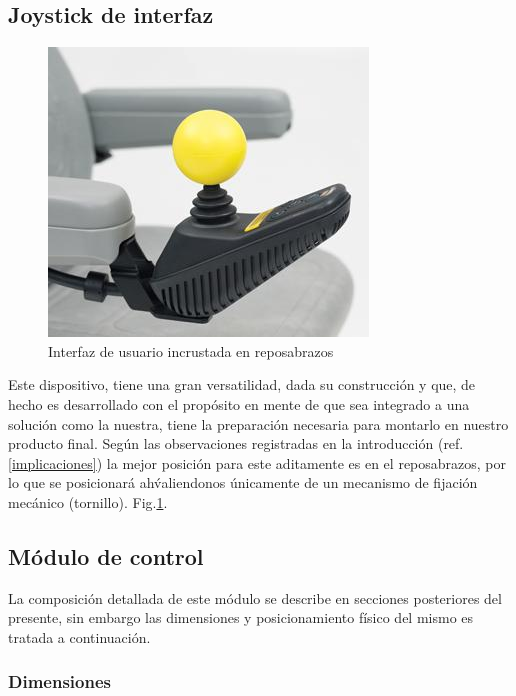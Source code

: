 \subsection{Joystick de interfaz}
\begin{figure}[th]
    \centering
    \includegraphics[width=.4\textwidth]{Figures/joystick.jpg}
    \decoRule
    \caption{Interfaz de usuario incrustada en reposabrazos}
    \label{fig:joy}
\end{figure}

Este dispositivo, tiene una gran versatilidad, dada su construcci\'on y que, de
hecho es desarrollado con el prop\'osito en mente de que sea integrado a una
soluci\'on como la nuestra, tiene la preparaci\'on necesaria para montarlo en
nuestro producto final. Seg\'un las observaciones registradas en la
introducci\'on (ref.\ref{implicaciones}) la mejor posici\'on para este
aditamente es en el reposabrazos, por lo que  se posicionar\'a ah\' valiendonos
\'unicamente de un mecanismo de fijaci\'on mec\'anico (tornillo).
Fig.\ref{fig:joy}.

\subsection{M\'odulo de control}

La composici\'on detallada de este m\'odulo se describe en secciones posteriores
del presente, sin embargo las dimensiones y posicionamiento f\'isico del mismo
es tratada a continuaci\'on.

\subsubsection{Dimensiones}

